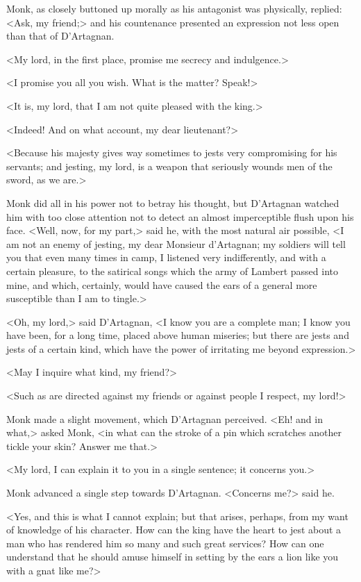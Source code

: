 Monk, as closely buttoned up morally as his antagonist was physically, replied: <Ask, my friend;> and his countenance presented an expression not less open than that of D'Artagnan.

<My lord, in the first place, promise me secrecy and indulgence.>

<I promise you all you wish. What is the matter? Speak!>

<It is, my lord, that I am not quite pleased with the king.>

<Indeed! And on what account, my dear lieutenant?>

<Because his majesty gives way sometimes to jests very compromising for his servants; and jesting, my lord, is a weapon that seriously wounds men of the sword, as we are.>

Monk did all in his power not to betray his thought, but D'Artagnan watched him with too close attention not to detect an almost imperceptible flush upon his face. <Well, now, for my part,> said he, with the most natural air possible, <I am not an enemy of jesting, my dear Monsieur d'Artagnan; my soldiers will tell you that even many times in camp, I listened very indifferently, and with a certain pleasure, to the satirical songs which the army of Lambert passed into mine, and which, certainly, would have caused the ears of a general more susceptible than I am to tingle.>

<Oh, my lord,> said D'Artagnan, <I know you are a complete man; I know you have been, for a long time, placed above human miseries; but there are jests and jests of a certain kind, which have the power of irritating me beyond expression.>

<May I inquire what kind, my friend?>

<Such as are directed against my friends or against people I respect, my lord!>

Monk made a slight movement, which D'Artagnan perceived. <Eh! and in what,> asked Monk, <in what can the stroke of a pin which scratches another tickle your skin? Answer me that.>

<My lord, I can explain it to you in a single sentence; it concerns you.>

Monk advanced a single step towards D'Artagnan. <Concerns me?> said he.

<Yes, and this is what I cannot explain; but that arises, perhaps, from my want of knowledge of his character. How can the king have the heart to jest about a man who has rendered him so many and such great services? How can one understand that he should amuse himself in setting by the ears a lion like you with a gnat like me?>

